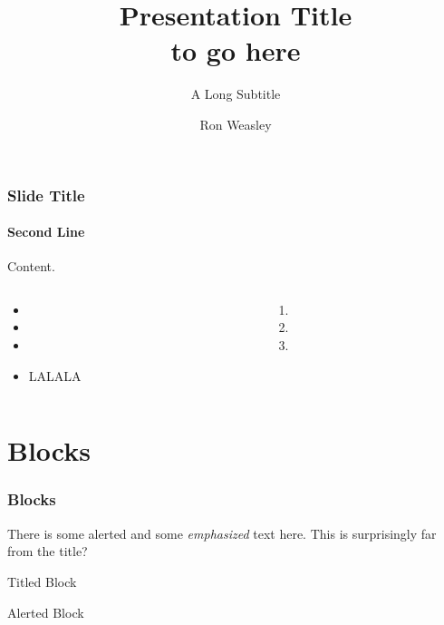 \documentclass[
aspectratio=169,
]{beamer}
\title{Presentation Title\\to go here}
\subtitle{A Long Subtitle}
\author{Ron Weasley}
\institute[Computer Science]{Liverpool}
\institute{Liverpool}
\begin{document}
%
%
\begin{frame}[uolcolours=Teal Green]
\maketitle
\end{frame}

\begin{frame}[t]
    \frametitle{Slide Title}
    \framesubtitle{Second Line}

    Content.
    \lipsum[1][1-2]

    \begin{columns}[T]
        \begin{column}{0.5\textwidth}
            \begin{itemize}
                \item \lipsum[1][2]
                \item \lipsum[2][2]
                \item \lipsum[3][2]

                    \LARGE
                \item LALALA
            \end{itemize}
        \end{column}

        \begin{column}{0.5\textwidth}
            \begin{enumerate}
                \item \lipsum[3][1]
                \item \lipsum[4][2]
                \item \lipsum[5][2]
            \end{enumerate}
        \end{column}
    \end{columns}
\end{frame}

\section{Blocks}
\begin{frame}
\frametitle{Blocks}
There is some \alert{alerted} and some \emph{emphasized} text here. This is surprisingly far from the title?
\begin{block}{Titled Block}
    \lipsum[1][1-2] 
\end{block}
\begin{alertblock}{Alerted Block}
    \lipsum[1][1-2] 
\end{alertblock}
\begin{example}[Muggle]
\end{example}

\end{frame}
\end{document}
